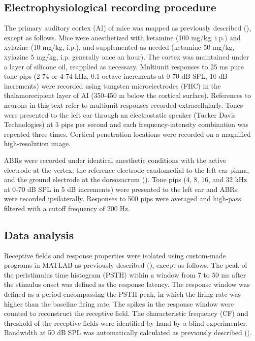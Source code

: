 \subsection{Electrophysiological recording procedure}

The primary auditory cortex (AI) of mice was mapped as previously described (\cite{Kim2009}), except as follows. Mice were anesthetized with ketamine (100 mg/kg, i.p.) and xylazine (10 mg/kg, i.p.), and supplemented as needed (ketamine 50 mg/kg, xylazine 5 mg/kg, i.p. generally once an hour). The cortex was maintained under a layer of silicone oil, reapplied as necessary. Multiunit responses to 25 ms pure tone pips (2-74 or 4-74 kHz, 0.1 octave increments at 0-70 dB SPL, 10 dB increments) were recorded using tungsten microelectrodes (FHC) in the thalamorecipient layer of AI (350-450 \textmu{}m below the cortical surface). References to neurons in this text refer to multiunit responses recorded extracellularly. Tones were presented to the left ear through an electrostatic speaker (Tucker Davis Technologies) at 3 pips per second and each frequency-intensity combination was repeated three times. Cortical penetration locations were recorded on a magnified high-resolution image.

ABRs were recorded under identical anesthetic conditions with the active electrode at the vertex, the reference electrode caudomedial to the left ear pinna, and the ground electrode at the dorsosacrum (\cite{OConnor1998, Popescu2010}). Tone pips (4, 8, 16, and 32 kHz at 0-70 dB SPL in 5 dB increments) were presented to the left ear and ABRs were recorded ipsilaterally. Responses to 500 pips were averaged and high-pass filtered with a cutoff frequency of 200 Hz.

\subsection{Data analysis}

Receptive fields and response properties were isolated using custom-made programs in MATLAB as previously described (\cite{Insanally2010}), except as follows. The peak of the peristimulus time histogram (PSTH) within a window from 7 to 50 ms after the stimulus onset was defined as the response latency. The response window was defined as a period encompassing the PSTH peak, in which the firing rate was higher than the baseline firing rate. The spikes in the response window were counted to reconstruct the receptive field. The characteristic frequency (CF) and threshold of the receptive fields were identified by hand by a blind experimenter. Bandwidth at 50 dB SPL was automatically calculated as previously described (\cite{Insanally2010}).


